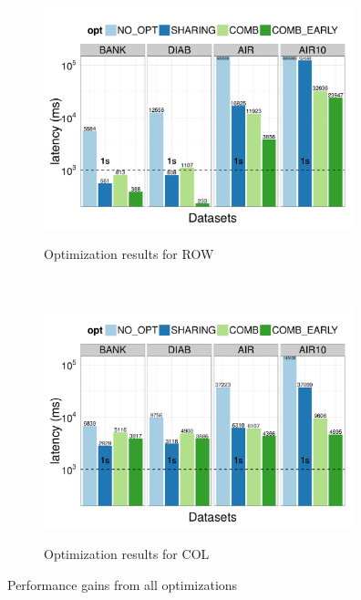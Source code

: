 \begin{figure}[h]
	\centering
	\begin{subfigure}{1\linewidth}
		\centering
		{\includegraphics[width=9cm] {Images/all_opt_real_data_row.pdf}}
		\caption{Optimization results for ROW}
		\label{fig:share_prune_row}
	\end{subfigure}\\
	\begin{subfigure}{1\linewidth}
		\centering
		{\includegraphics[width=9cm] {Images/all_opt_real_data_col.pdf}}
		\caption{Optimization results for COL}
		\label{fig:share_prune_col}
	\end{subfigure}
	\vspace{-10pt}
	\caption{Performance gains from all optimizations}
	\label{fig:all_opt_with_pruning}
	\vspace{-15pt}
\end{figure}
 
